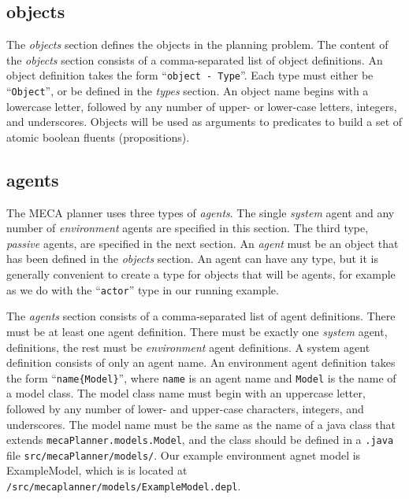 \documentclass{article}
\begin{document}
{\subsection{objects}

The \emph{objects} section defines the objects in the planning problem.
The content of the \emph{objects} section consists of a comma-separated list of
object definitions. An object definition takes the form ``\texttt{object -
Type}''. Each type must
either be ``\texttt{Object}'', or be defined in the \emph{types} section.  An
object name begins with a lowercase letter, followed by any number of upper-
or lower-case letters, integers, and underscores.
Objects will be used as arguments to predicates to build a set of atomic
boolean fluents (propositions).


\subsection{agents}

The MECA planner uses three types of \emph{agents}. The single
\emph{system} agent and any number of \emph{environment} agents are specified in
this section.  The third type, \emph{passive} agents, are specified in the next
section. 
An \emph{agent} must be an object that has been defined in the
\emph{objects} section. An agent can have any type, but it is generally
convenient to create a type for objects that will be agents, for example 
as we do with the ``\texttt{actor}'' type in our running example.

The \emph{agents} section consists of a comma-separated list of agent
definitions. There must be at least one agent definition. There must be exactly
one \emph{system} agent, definitions, the rest must be \emph{environment} agent
definitions. A system agent definition consists of only an agent name.
An environment
agent definition takes the form ``\texttt{name\{Model\}}'', where \texttt{name}
is an agent name and \texttt{Model} is the name of a model class. The model
class name must begin with an uppercase letter, followed by any number of
lower- and upper-case characters, integers, and underscores. The model name must
be the same as the name of a java class that extends
\texttt{mecaPlanner.models.Model}, and the class should be defined in a
\texttt{.java} file \texttt{src/mecaPlanner/models/}. Our example environment
agnet model is ExampleModel, which is is located at
\texttt{/src/mecaplanner/models/ExampleModel.depl}.



}
\end{document}
